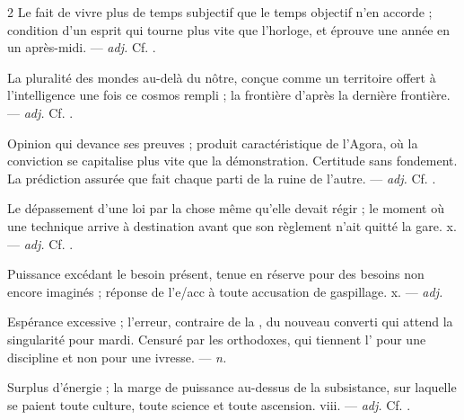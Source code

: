 \begin{multicols}{2}
 Le fait de vivre plus de temps subjectif que le temps objectif n'en accorde ; condition d'un esprit qui tourne plus vite que l'horloge, et éprouve une année en un après-midi.  —  \textit{adj.} Cf. .

 La pluralité des mondes au-delà du nôtre, conçue comme un territoire offert à l'intelligence une fois ce cosmos rempli ; la frontière d'après la dernière frontière. —  \textit{adj.} Cf. .

 Opinion qui devance ses preuves ; produit caractéristique de l'Agora, où la conviction se capitalise plus vite que la démonstration.   Certitude sans fondement.   La prédiction assurée que fait chaque parti de la ruine de l'autre. —  \textit{adj.} Cf. .

 Le dépassement d'une loi par la chose même qu'elle devait régir ; le moment où une technique arrive à destination avant que son règlement n'ait quitté la gare.   x. —  \textit{adj.} Cf. .

 Puissance excédant le besoin présent, tenue en réserve pour des besoins non encore imaginés ; réponse de l'e/acc à toute accusation de gaspillage.   x. —  \textit{adj.}

 Espérance excessive ; l'erreur, contraire de la , du nouveau converti qui attend la singularité pour mardi. Censuré par les orthodoxes, qui tiennent l' pour une discipline et non pour une ivresse. —  \textit{n.}

 Surplus d'énergie ; la marge de puissance au-dessus de la subsistance, sur laquelle se paient toute culture, toute science et toute ascension.   viii. —  \textit{adj.} Cf. .


\end{multicols}
